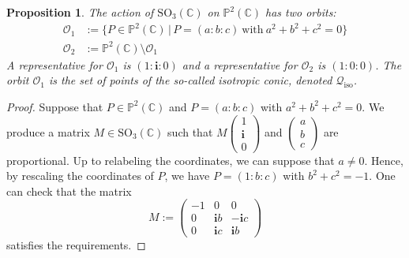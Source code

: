 \documentclass{amsart}
\theoremstyle{plain}
\newtheorem{prop}[lemma]{Proposition}
\theoremstyle{definition}
\newcommand{\C}{\mathbb{C}}
\newcommand{\p}{\mathbb{P}}
\newcommand{\iso}{\mathcal{Q}_{\mathrm{iso}}}
\newcommand{\iii}{\textbf{i}}
\begin{document}
\begin{prop}
\label{two_orbits}
 The action of $\mathrm{SO}_3(\mathbb{C})$ on $\p^2(\C)$ has two orbits:
 \begin{align*}
  \mathcal{O}_1 &:=
  \bigl\{
   P \in \p^2(\C) \, | \,
   P = (a:b:c) \ \text{with} \ a^2 + b^2 + c^2 = 0
  \bigr\} \\
  \mathcal{O}_2 &:= \p^2(\C) \setminus \mathcal{O}_1
 \end{align*}
 A representative for $\mathcal{O}_1$ is $(1:\iii:0)$ and a
representative for $\mathcal{O}_2$ is $(1:0:0)$.
The orbit $\mathcal{O}_1$ is the set of points of the so-called \emph{isotropic conic}, denoted $\iso$.
\end{prop}
\begin{proof}
 Suppose that $P \in \p^2(\C)$ and $P = (a:b:c)$ with $a^2 + b^2 + c^2 = 0$.
 We produce a matrix $M \in \mathrm{SO}_3(\C)$ such that $M \left(\begin{smallmatrix} 1 \\ \iii \\ 0 \end{smallmatrix}\right)$ and $\left(\begin{smallmatrix} a \\ b \\ c \end{smallmatrix}\right)$ are proportional.
 Up to relabeling the coordinates, we can suppose that $a \neq 0$.
 Hence, by rescaling the coordinates of $P$, we have $P = (1: b: c)$ with $b^2 + c^2 = -1$.
 One can check that the matrix
 \[
  M :=
  \begin{pmatrix}
   -1 & 0 & 0 \\
   0 & \iii b & -\iii c \\
   0 & \iii c & \iii b
  \end{pmatrix}
 \]
 satisfies the requirements.


\end{proof}
\end{document}
